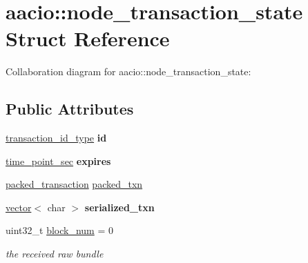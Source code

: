 \hypertarget{structaacio_1_1node__transaction__state}{}\section{aacio\+:\+:node\+\_\+transaction\+\_\+state Struct Reference}
\label{structaacio_1_1node__transaction__state}


Collaboration diagram for aacio\+:\+:node\+\_\+transaction\+\_\+state\+:
\subsection*{Public Attributes}
\begin{DoxyCompactItemize}
\item 
\mbox{\label{structaacio_1_1node__transaction__state_af60baf060863076e0fbb6efad72fa30f}} 
\mbox{\hyperlink{classfc_1_1sha256}{transaction\+\_\+id\+\_\+type}} {\bfseries id}
\item 
\mbox{\label{structaacio_1_1node__transaction__state_ab1ce897c28c9c10cb6930d3d51734939}} 
\mbox{\hyperlink{classfc_1_1time__point__sec}{time\+\_\+point\+\_\+sec}} {\bfseries expires}
\item 
\mbox{\hyperlink{structaacio_1_1chain_1_1packed__transaction}{packed\+\_\+transaction}} \mbox{\hyperlink{structaacio_1_1node__transaction__state_a4d51156ad0895003949f8e7e8c7c7231}{packed\+\_\+txn}}
\item 
\mbox{\label{structaacio_1_1node__transaction__state_af1f237495ed209ba93529d4734c5cdbd}} 
\mbox{\hyperlink{classstd_1_1vector}{vector}}$<$ char $>$ {\bfseries serialized\+\_\+txn}
\item 
\mbox{\label{structaacio_1_1node__transaction__state_a370330eda33f7e2eea44d3d3fe3e5c02}} 
uint32\+\_\+t \mbox{\hyperlink{structaacio_1_1node__transaction__state_a370330eda33f7e2eea44d3d3fe3e5c02}{block\+\_\+num}} = 0
\begin{DoxyCompactList}\small\item\em the received raw bundle \end{DoxyCompactList}\item 
\mbox{\label{structaacio_1_1node__transaction__state_ac8f765ac503ac09999d4386b2c6b9b8b}} 

\end{DoxyCompactItemize}
